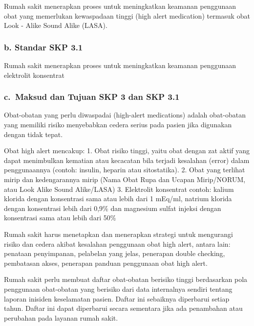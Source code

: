 \documentclass[
]{book}
\begin{document}
Rumah sakit menerapkan proses untuk meningkatkan keamanan penggunaan obat yang memerlukan kewaspadaan tinggi (high alert medication) termasuk obat Look - Alike Sound Alike (LASA).

\hypertarget{b.-standar-skp-3.1}{%
\subsubsection*{b. Standar SKP 3.1}\label{b.-standar-skp-3.1}}

Rumah sakit menerapkan proses untuk meningkatkan keamanan penggunaan elektrolit konsentrat

\hypertarget{c.-maksud-dan-tujuan-skp-3-dan-skp-3.1}{%
\subsubsection*{c.~Maksud dan Tujuan SKP 3 dan SKP 3.1}\label{c.-maksud-dan-tujuan-skp-3-dan-skp-3.1}}

Obat-obatan yang perlu diwaspadai (high-alert medications) adalah obat-obatan yang memiliki risiko menyebabkan cedera serius pada pasien jika digunakan dengan tidak tepat.

Obat high alert mencakup:
1. Obat risiko tinggi, yaitu obat dengan zat aktif yang dapat menimbulkan kematian atau kecacatan bila terjadi kesalahan (error) dalam penggunaannya (contoh: insulin, heparin atau sitostatika).
2. Obat yang terlihat mirip dan kedengarannya mirip (Nama Obat Rupa dan Ucapan Mirip/NORUM, atau Look Alike Sound Alike/LASA)
3. Elektrolit konsentrat contoh: kalium klorida dengan konsentrasi sama atau lebih dari 1 mEq/ml, natrium klorida dengan konsentrasi lebih dari 0,9\% dan magnesium sulfat injeksi dengan konsentrasi sama atau lebih dari 50\%

Rumah sakit harus menetapkan dan menerapkan strategi untuk mengurangi risiko dan cedera akibat kesalahan penggunaan obat high alert, antara lain: penataan penyimpanan, pelabelan yang jelas, penerapan double checking, pembatasan akses, penerapan panduan penggunaan obat high alert.

Rumah sakit perlu membuat daftar obat-obatan berisiko tinggi berdasarkan pola penggunaan obat-obatan yang berisiko dari data internalnya sendiri tentang laporan inisiden keselamatan pasien. Daftar ini sebaiknya diperbarui setiap tahun. Daftar ini dapat diperbarui secara sementara jika ada penambahan atau perubahan pada layanan rumah sakit.
\end{document}

